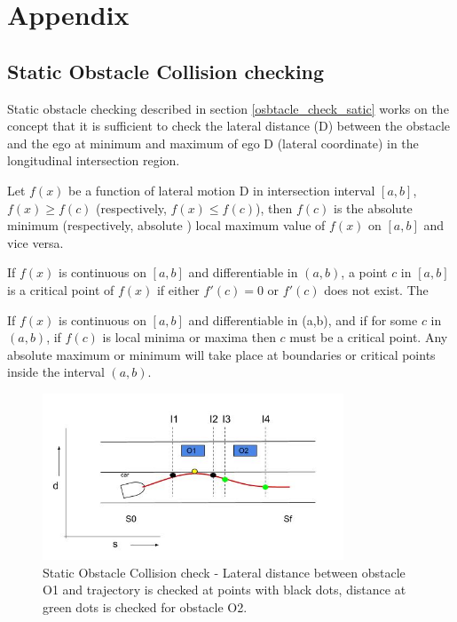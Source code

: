 \chapter{Appendix}

\section{Static Obstacle Collision checking}
\label{static_obst_appendix}
Static obstacle checking described in section \ref{osbtacle_check_satic} works on the concept that it is sufficient to check the lateral distance (D) between the obstacle and the ego at minimum and maximum of ego D (lateral coordinate) in the longitudinal intersection region.

Let $f(x)$ be a function of lateral motion D in intersection interval $[a,b]$, $f(x)\ge f(c)$ (respectively, $f(x)\le f(c)$), then $f(c)$ is the absolute minimum (respectively, absolute ) local maximum value of $f(x)$ on $[a,b]$ and vice versa. 

If $f(x)$ is continuous on $[a, b]$ and differentiable in $(a, b)$, a point $c$ in $[a, b]$ is a critical point of $f(x)$ if either $f'(c) =0$ or $f'(c)$ does not exist. The 

If $f(x)$ is continuous on $[a,b]$ and differentiable in (a,b), and if for some $c$ in $(a,b)$, if $f(c)$ is local minima or maxima then $c$ must be a critical point. Any absolute maximum or minimum will take place at boundaries or critical points inside the interval $(a,b)$. 


\begin{figure}[H]
	\centering
	\includegraphics[width=0.8\textwidth]{Images/appendix/staticpoints.jpg}
	\caption{Static Obstacle Collision check - Lateral distance between obstacle O1 and trajectory is checked at points with black dots, distance at green dots is checked for obstacle O2.}
	\label{cstat_coll_appen}
\end{figure}

